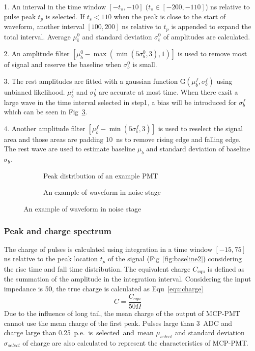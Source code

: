 1. An interval in the time window $[-t_s,-10]$ ($t_s\in[-200,-110]$) ns relative to pulse peak $t_p$ is selected. If $t_s<110$ when the peak is close to the start of waveform, another interval $[100,200]$ ns relative to $t_p$ is appended to expand the total interval. Average $\mu_b^0$ and standard deviation $\sigma_b^0$ of amplitudes are calculated.

2. An amplitude filter $[\mu_b^0-\max(\min(5\sigma_b^0,3),1)]$ is used to remove most of signal and reserve the baseline when $\sigma_b^0$ is small.

3. The rest amplitudes are fitted with a gaussian function G$(\mu_b^f,\sigma_b^f)$ using unbinned likelihood. $\mu_b^f$ and $\sigma_b^f$ are accurate at most time. When there exsit a large wave in the time interval selected in step1, a bias will be introduced for $\sigma_b^f$ which can be seen in Fig~\ref{fig:baselineBias2}.

4. Another amplitude filter $[\mu_b^f-\min(5\sigma_b^f,3)]$ is used to reselect the signal area and those areas are padding \SI{10}{ns} to remove rising edge and falling edge. The rest wave are used to estimate baseline $\mu_b$ and standard deviation of baseline $\sigma_b$.
\begin{figure}[!htbp]
    \centering
    \begin{subfigure}[b]{0.7\textwidth}
        \caption{Peak distribution of an example PMT}%
        \label{fig:baselineBias1}
    \end{subfigure}
    \begin{subfigure}[b]{0.3\textwidth}
        \caption{An example of waveform in noise stage}
        \label{fig:baselineBias2}
    \end{subfigure}
\end{figure}

\subsubsection{Peak and charge spectrum}
\label{sec:noisepeak}
The charge of pulses is calculated using integration in a time window $[-15, 75]$ ns relative to the peak location $t_p$ of the signal (Fig~\ref{fig:baseline2}) considering the rise time and fall time distribution. The equivalent charge $C_{\mathrm{equ}}$ is defined as the summation of the amplitude in the integration interval. Considering the input impedance is \SI{50}{\Omega}, the true charge is calculated as Equ~\eqref{equ:charge} 
\begin{equation}
    \label{equ:charge}
    C = \frac{C_{equ}}{50\Omega}
\end{equation}
Due to the influence of long tail, the mean charge of the output of MCP-PMT cannot use the mean charge of the first peak. Pulses large than \SI{3}{ADC} and charge large than \SI{0.25}{p.e.} is selected and mean $\mu_{select}$ and standard deviation $\sigma_{select}$ of charge are also calculated to represent the characteristics of MCP-PMT.

